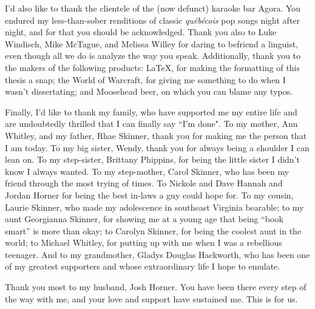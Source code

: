 I'd also like to thank the clientele of the (now defunct) karaoke bar Agora. You endured my less-than-sober renditions of classic \textit{qu\'{e}b\'{e}cois} pop songs night after night, and for that you should be acknowledged. Thank you also to Luke Windisch, Mike McTague, and Melissa Willey for daring to befriend a linguist, even though all we do is analyze the way you speak. Additionally, thank you to the makers of the following products: \LaTeX, for making the formatting of this thesis a snap; the World of Warcraft, for giving me something to do when I wasn't dissertating; and Moosehead beer, on which you can blame any typos.

Finally, I'd like to thank my family, who have supported me my entire life and are undoubtedly thrilled that I can finally say ``I'm done". To my mother, Ann Whitley, and my father, Rhae Skinner, thank you for making me the person that I am today. To my big sister, Wendy, thank you for always being a shoulder I can lean on. To my step-sister, Brittany Phippins, for being the little sister I didn't know I always wanted. To my step-mother, Carol Skinner, who has been my friend through the most trying of times. To Nickole and Dave Hannah and Jordan Horner for being the best in-laws a guy could hope for. To my cousin, Laurie Skinner, who made my adolescence in southeast Virginia bearable; to my aunt Georgianna Skinner, for showing me at a young age that being ``book smart'' is more than okay; to Carolyn Skinner, for being the coolest aunt in the world; to Michael Whitley, for putting up with me when I was a rebellious teenager. And to my grandmother, Gladys Douglas Hackworth, who has been one of my greatest supporters and whose extraordinary life I hope to emulate.

Thank you most to my husband, Josh Horner. You have been there every step of the way with me, and your love and support have sustained me. This is for us.

\onehalfspacing